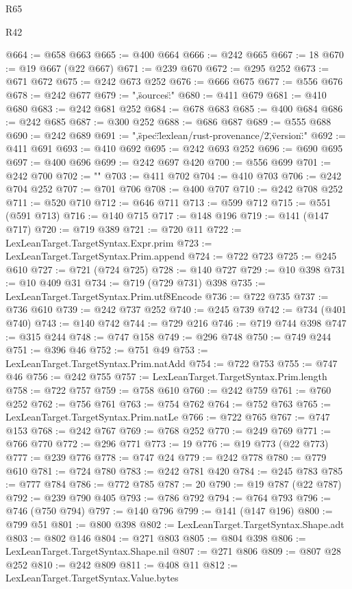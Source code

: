 \begin{lexlean}{R65}
\begin{lexlean}{R42}
\begin{coremodule}
{{{{{{{{{{{{{{{{{{{{{{{{{{{{{{{{{{{{{{{{{{{{{{{{{{{{{{{{{{{{{{{{{{{{{{{{{{{{{{{{{{{{{{{{{{{{{{{{{{{{{{{{{{{{{{{{{{{{{{{{{{{{{{{{{{{{{{{{{{{{{{{{{{{{{{{{{{{{{{{{{{{{{{{{{{{{{{{{{{{{{{{{@664 := @658 @663
@665 := @400 @664
@666 := @242 @665
@667 := 18
@670 := @19 @667 (@22 @667)
@671 := @239 @670
@672 := @295 @252
@673 := @671 @672
@675 := @242 @673 @252
@676 := @666 @675
@677 := @556 @676
@678 := @242 @677
@679 := ",\"sources\":"
@680 := @411 @679
@681 := @410 @680
@683 := @242 @681 @252
@684 := @678 @683
@685 := @400 @684
@686 := @242 @685
@687 := @300 @252
@688 := @686 @687
@689 := @555 @688
@690 := @242 @689
@691 := ",\"spec\":\"lexlean/rust-provenance/2\",\"version\":"
@692 := @411 @691
@693 := @410 @692
@695 := @242 @693 @252
@696 := @690 @695
@697 := @400 @696
@699 := @242 @697 @420
@700 := @556 @699
@701 := @242 @700
@702 := "}\n"
@703 := @411 @702
@704 := @410 @703
@706 := @242 @704 @252
@707 := @701 @706
@708 := @400 @707
@710 := @242 @708 @252
@711 := @520 @710
@712 := @646 @711
@713 := @599 @712
@715 := @551 (@591 @713)
@716 := @140 @715
@717 := @148 @196
@719 := @141 (@147 @717)
@720 := @719 @389
@721 := @720 @11
@722 := LexLeanTarget.TargetSyntax.Expr.prim
@723 := LexLeanTarget.TargetSyntax.Prim.append
@724 := @722 @723
@725 := @245 @610
@727 := @721 (@724 @725)
@728 := @140 @727
@729 := @10 @398
@731 := @10 @409 @31
@734 := @719 (@729 @731) @398
@735 := LexLeanTarget.TargetSyntax.Prim.utf8Encode
@736 := @722 @735
@737 := @736 @610
@739 := @242 @737 @252
@740 := @245 @739
@742 := @734 (@401 @740)
@743 := @140 @742
@744 := @729 @216
@746 := @719 @744 @398
@747 := @315 @244
@748 := @747 @158
@749 := @296 @748
@750 := @749 @244
@751 := @396 @46
@752 := @751 @49
@753 := LexLeanTarget.TargetSyntax.Prim.natAdd
@754 := @722 @753
@755 := @747 @46
@756 := @242 @755
@757 := LexLeanTarget.TargetSyntax.Prim.length
@758 := @722 @757
@759 := @758 @610
@760 := @242 @759
@761 := @760 @252
@762 := @756 @761
@763 := @754 @762
@764 := @752 @763
@765 := LexLeanTarget.TargetSyntax.Prim.natLe
@766 := @722 @765
@767 := @747 @153
@768 := @242 @767
@769 := @768 @252
@770 := @249 @769
@771 := @766 @770
@772 := @296 @771
@773 := 19
@776 := @19 @773 (@22 @773)
@777 := @239 @776
@778 := @747 @24
@779 := @242 @778
@780 := @779 @610
@781 := @724 @780
@783 := @242 @781 @420
@784 := @245 @783
@785 := @777 @784
@786 := @772 @785
@787 := 20
@790 := @19 @787 (@22 @787)
@792 := @239 @790 @405
@793 := @786 @792
@794 := @764 @793
@796 := @746 (@750 @794)
@797 := @140 @796
@799 := @141 (@147 @196)
@800 := @799 @51
@801 := @800 @398
@802 := LexLeanTarget.TargetSyntax.Shape.adt
@803 := @802 @146
@804 := @271 @803
@805 := @804 @398
@806 := LexLeanTarget.TargetSyntax.Shape.nil
@807 := @271 @806
@809 := @807 @28 @252
@810 := @242 @809
@811 := @408 @11
@812 := LexLeanTarget.TargetSyntax.Value.bytes
}}}}}}}}}}}}}}}}}}}}}}}}}}}}}}}}}}}}}}}}}}}}}}}}}}}}}}}}}}}}}}}}}}}}}}}}}}}}}}}}}}}}}}}}}}}}}}}}}}}}}}}}}}}}}}}}}}}}}}}}}}}}}}}}}}}}}}}}}}}}}}}}}}}}}}}}}}}}}}}}}}}}}}}}}}}}}}}}}}}}}}}
\end{coremodule}
\end{lexlean}
\end{lexlean}
